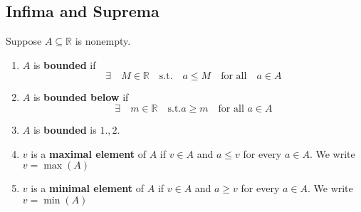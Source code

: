 \documentclass{article}
\theoremstyle{remark}
\begin{document}
\subsection{Infima and Suprema}%
\label{sub:infima_and_suprema}

\begin{definition}
  Suppose $A \subseteq \mathbb{R} $ is nonempty.
  \begin{enumerate}
    \item $A$ is \textbf{bounded}  if  \[
    \exists \quad   M \in  \mathbb{R}  \quad \text{s.t.} \quad a \le M \quad \text{for all} \quad a \in  A    
    \] 
  \item $A$ is \textbf{bounded below}  if \[
  \exists \quad   m \in \mathbb{R} \quad \text{s.t.} a \ge m \quad \text{for all } a \in  A  
  \] 
\item $A$ is \textbf{bounded}  is $1.,2.$
\item  $v$ is a \textbf{maximal element } of $A$ if $v \in A$ and $a \le v$ for every $a \in  A$. We write $v = \max \left( A \right)$
\item $v$ is a \textbf{minimal element }  of $A$ if $v \in  A$ and $a \ge v$ for every $a \in  A$. We write $v = \min \left( A \right)$
  \end{enumerate}
\end{definition}
\end{document}

